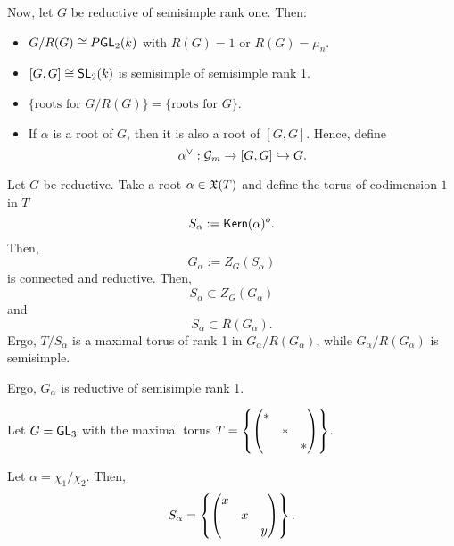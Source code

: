 Now, let $G$ be reductive of semisimple rank one. Then:
\begin{itemize}
	\item $G /R(G) \overset{}{\cong} P \textsf{GL}_2(k)$ with $R(G) = 1$ or $R(G) = \mu_n$.
	\item $[G,G] \overset{}{\cong} \textsf{SL}_2(k)$ is semisimple of semisimple rank 1.
	\item $\{ \text{roots for }G/R(G) \} = \{ \text{roots for } G\}$.
	\item If $\alpha$ is a root of $G$, then it is also a root of $[G,G]$. Hence, define
	\[ \alpha^\vee : \mathcal{G}_m \overset{}{\rightarrow} [G,G] \overset{}{\hookrightarrow} G. \]
\end{itemize}
Let $G$ be reductive. Take a root $\alpha \in \mathfrak{X}(T)$ and define the torus of codimension $1$ in $T$
\[ S_\alpha := \textsf{Kern} (\alpha)^o. \]
Then,
\[ G_\alpha := Z_G(S_\alpha) \]
is connected and reductive.
Then,
\[ S_\alpha \subset Z_G(G_\alpha) \]
and
\[ S_\alpha \subset R(G_\alpha). \]
Ergo, $T / S_\alpha$ is a maximal torus of rank 1 in $G_\alpha / R(G_\alpha)$, while $G_\alpha / R(G_\alpha)$ is semisimple.

Ergo, $G_\alpha$ is reductive of semisimple rank 1.

\begin{example}
	Let $G = \textsf{GL}_3$ with the maximal torus $ T = \left\lbrace\left(\begin{matrix} * & & \\ & * & \\ & & * \end{matrix}\right)\right\rbrace$.
	
	Let $\alpha = \chi_1 / \chi_2$. Then,
	\[ S_\alpha = \left\lbrace\left(\begin{matrix} x & & \\ & x & \\ & & y \end{matrix}\right)\right\rbrace. \]
\end{example}